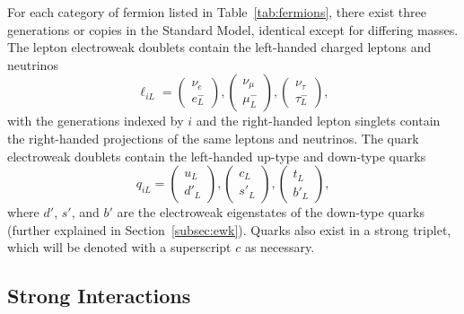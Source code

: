 For each category of fermion listed in Table~\ref{tab:fermions}, there exist three generations or copies in the Standard Model, identical except for differing masses.
The lepton electroweak doublets contain the left-handed charged leptons and neutrinos
\begin{equation}
  \ell_{iL} = \begin{pmatrix} \nu_e \\ e^{-}_L \end{pmatrix} ,
              \begin{pmatrix} \nu_\mu \\ \mu^{-}_L \end{pmatrix} ,
              \begin{pmatrix} \nu_\tau \\ \tau^{-}_L \end{pmatrix} ,
\end{equation}
with the generations indexed by $i$ and the right-handed lepton singlets contain the right-handed projections of the same leptons and neutrinos.
The quark electroweak doublets contain the left-handed up-type and down-type quarks
\begin{equation}
  q_{iL} = \begin{pmatrix} u_L \\ d'_L \end{pmatrix} ,
           \begin{pmatrix} c_L \\ s'_L \end{pmatrix} ,
           \begin{pmatrix} t_L \\ b'_L \end{pmatrix} ,
\end{equation}
where $d'$, $s'$, and $b'$ are the electroweak eigenstates of the down-type quarks (further explained in Section~\ref{subsec:ewk}). Quarks also exist in a strong triplet, which will be denoted with a superscript $c$ as necessary.

\subsection{Strong Interactions}
\label{subsec:qcd}

